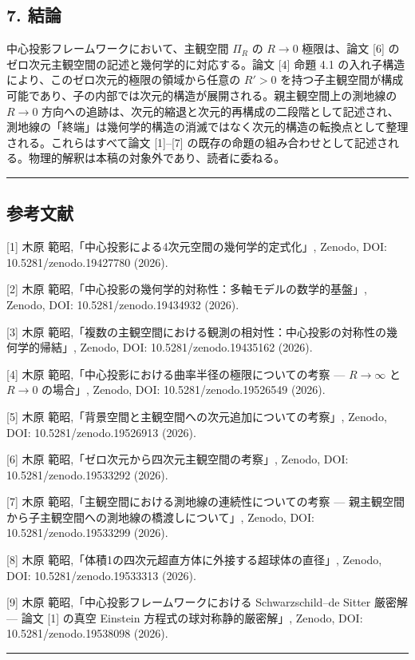 \documentclass[a4paper,11pt]{ltjsarticle}
\theoremstyle{definition}
\begin{document}
\subsection{7. 結論}\label{ux7d50ux8ad6}

中心投影フレームワークにおいて、主観空間 \(\Pi_R\) の \(R \to 0\)
極限は、論文 {[}6{]} のゼロ次元主観空間の記述と幾何学的に対応する。論文
{[}4{]} 命題 4.1 の入れ子構造により、このゼロ次元的極限の領域から任意の
\(R' > 0\)
を持つ子主観空間が構成可能であり、子の内部では次元的構造が展開される。親主観空間上の測地線の
\(R \to 0\)
方向への追跡は、次元的縮退と次元的再構成の二段階として記述され、測地線の「終端」は幾何学的構造の消滅ではなく次元的構造の転換点として整理される。これらはすべて論文
{[}1{]}--{[}7{]}
の既存の命題の組み合わせとして記述される。物理的解釈は本稿の対象外であり、読者に委ねる。

\begin{center}\rule{0.5\linewidth}{0.5pt}\end{center}

\subsection{参考文献}\label{ux53c2ux8003ux6587ux732e}

{[}1{]} 木原 範昭,「中心投影による4次元空間の幾何学的定式化」, Zenodo,
DOI: 10.5281/zenodo.19427780 (2026).

{[}2{]} 木原 範昭,「中心投影の幾何学的対称性：多軸モデルの数学的基盤」,
Zenodo, DOI: 10.5281/zenodo.19434932 (2026).

{[}3{]} 木原
範昭,「複数の主観空間における観測の相対性：中心投影の対称性の幾何学的帰結」,
Zenodo, DOI: 10.5281/zenodo.19435162 (2026).

{[}4{]} 木原 範昭,「中心投影における曲率半径の極限についての考察 ---
\(R \to \infty\) と \(R \to 0\) の場合」, Zenodo, DOI:
10.5281/zenodo.19526549 (2026).

{[}5{]} 木原 範昭,「背景空間と主観空間への次元追加についての考察」,
Zenodo, DOI: 10.5281/zenodo.19526913 (2026).

{[}6{]} 木原 範昭,「ゼロ次元から四次元主観空間の考察」, Zenodo, DOI:
10.5281/zenodo.19533292 (2026).

{[}7{]} 木原 範昭,「主観空間における測地線の連続性についての考察 ---
親主観空間から子主観空間への測地線の橋渡しについて」, Zenodo, DOI:
10.5281/zenodo.19533299 (2026).

{[}8{]} 木原 範昭,「体積1の四次元超直方体に外接する超球体の直径」,
Zenodo, DOI: 10.5281/zenodo.19533313 (2026).

{[}9{]} 木原 範昭,「中心投影フレームワークにおける Schwarzschild--de
Sitter 厳密解 --- 論文 {[}1{]} の真空 Einstein
方程式の球対称静的厳密解」, Zenodo, DOI: 10.5281/zenodo.19538098 (2026).

\begin{center}\rule{0.5\linewidth}{0.5pt}\end{center}
\end{document}
